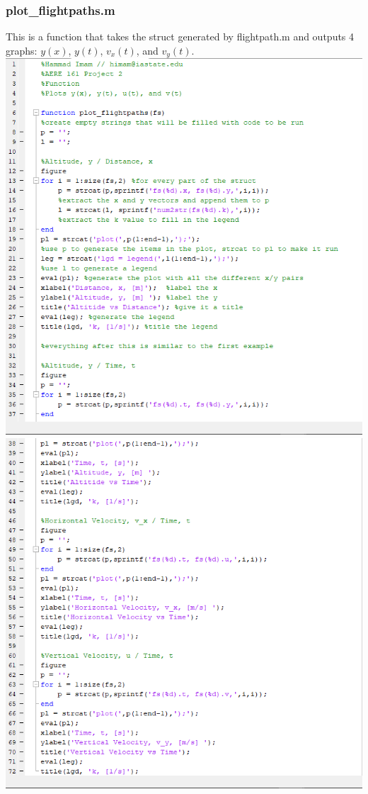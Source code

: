 \documentclass[oneside]{article}
\begin{document}
\subsubsection{plot\_flightpaths.m}
This is a function that takes the struct generated by flightpath.m and outputs 4 graphs: $y(x)$, $y(t)$, $v_x(t)$, and $v_y(t)$.\\
\includegraphics [width=\linewidth*2/3]{code_plot_flightpaths1.png}\\
\includegraphics [width=\linewidth*2/3]{code_plot_flightpaths2.png}
\newpage
\end{document}
